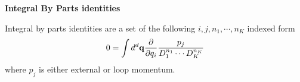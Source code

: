 \documentclass[10pt]{article}
\begin{document}
\textbf{Integral By Parts identities}

Integral by parts identities are a set of the following $i,j, n_1,\cdots, n_K$ indexed form
\begin{eqnarray}
0 = \int d^d \bold{q} \frac{\partial }{\partial q_i} \frac{p_j}{D_1^{n_1} \cdots D_K^{n_K}} 
\end{eqnarray}
where $p_j$ is either external or loop momentum.
\end{document}
